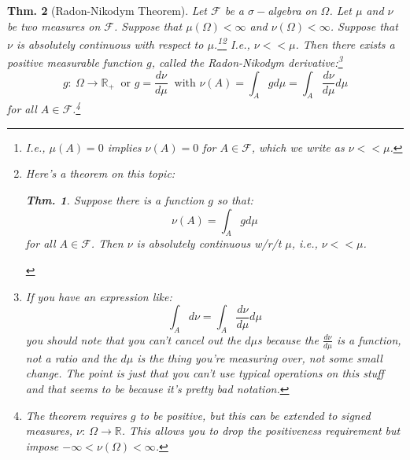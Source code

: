 \documentclass{tufte-book}
\theoremstyle{mytheoremstyle}
\newtheorem*{thm}{Thm.}
\theoremstyle{mylemstyle}
\theoremstyle{mydefstyle}
\begin{document}
\begin{thm}[Radon-Nikodym Theorem] Let \(\mathcal{F}\) be a \(\sigma-\)algebra on \(\Omega\). Let \(\mu\) and \(\nu\) be two measures on \(\mathcal{F}\). Suppose that \(\mu(\Omega) < \infty\) and \(\nu(\Omega) < \infty\). Suppose that \(\nu\) is absolutely continuous with respect to \(\mu\).\footnote{I.e., \(\mu(A) = 0\) implies \(\nu(A) = 0\) for \(A \in \mathcal{F}\), which we write as \(\nu << \mu\).}\footnote{Here's a theorem on this topic: \begin{thm}Suppose there is a function \(g\) so that:
	\[\nu(A) = \int_A g d\mu\]
for all \(A\in \mathcal{F}\). Then \(\nu\) is absolutely continuous w/r/t \(\mu\), i.e., \(\nu << \mu\). \end{thm}} I.e., \(\nu << \mu\). Then there exists a positive measurable function \(g\), called the Radon-Nikodym derivative:\footnote{If you have an expression like: 
	\[\int_A d\nu = \int_A \frac{d \nu}{d\mu} d\mu\]
you should note that you can't cancel out the \(d\mu\)s because the \(\frac{d\nu}{d\mu}\) is a function, not a ratio and the \(d\mu\) is the thing you're measuring over, not some small change. The point is just that you can't use typical operations on this stuff and that seems to be because it's pretty bad notation.}
	\[g:\ \Omega \rightarrow \mathbb{R}_{+}\ \text{ or } g=\frac{d\nu}{d\mu}\ \text{ with } \nu(A) = \int_A g d\mu = \int_A \frac{d\nu}{d\mu}d\mu\]
for all \(A \in \mathcal{F}\).\footnote[][.3cm]{The theorem requires \(g\) to be positive, but this can be extended to signed measures, \(\nu:\ \Omega \rightarrow \mathbb{R}\). This allows you to drop the positiveness requirement but impose \(-\infty < \nu(\Omega) < \infty\).}
\end{thm}
\end{document}
